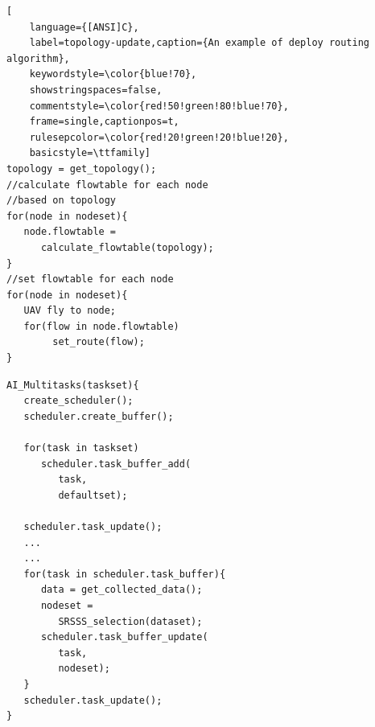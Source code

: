 \begin{lstlisting}[
	language={[ANSI]C},
	label=topology-update,caption={An example of deploy routing algorithm},
	keywordstyle=\color{blue!70},
	showstringspaces=false,
	commentstyle=\color{red!50!green!80!blue!70},
	frame=single,captionpos=t,
	rulesepcolor=\color{red!20!green!20!blue!20},
	basicstyle=\ttfamily]
topology = get_topology();
//calculate flowtable for each node
//based on topology
for(node in nodeset){
   node.flowtable =
      calculate_flowtable(topology);
}
//set flowtable for each node
for(node in nodeset){
   UAV fly to node;
   for(flow in node.flowtable)
        set_route(flow);
}

\end{lstlisting}

\begin{lstlisting}[language={[ANSI]C},label=AI,
	caption={An example of AI selection and Muti-tasks},
	keywordstyle=\color{blue!70},
	showstringspaces=false,
	commentstyle=\color{red!50!green!80!blue!70},
	frame=single,captionpos=t,
	rulesepcolor=\color{red!20!green!20!blue!20},
	basicstyle=\ttfamily]
AI_Multitasks(taskset){
   create_scheduler();
   scheduler.create_buffer();

   for(task in taskset)
      scheduler.task_buffer_add(
         task,
         defaultset);

   scheduler.task_update();
   ...
   ...
   for(task in scheduler.task_buffer){
      data = get_collected_data();
      nodeset =
         SRSSS_selection(dataset);
      scheduler.task_buffer_update(
         task,
         nodeset);
   }
   scheduler.task_update();
}

\end{lstlisting}


